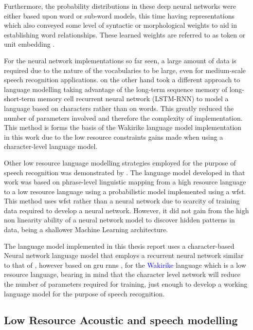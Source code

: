 Furthermore, the probability distributions in these deep neural networks were either based upon word or sub-word models, this time having representations which also conveyed some level of syntactic or morphological weights to aid in establishing word relationships.  These learned weights are referred to as token or unit embedding \citep{pennington-etal-2014-glove}.

For the neural network implementations so far seen, a large amount of data is required due to the nature of the vocabularies to be large, even for medium-scale speech recognition applications.   \cite{kim2016character} on the other hand took a different approach to language modelling taking advantage of the long-term sequence memory of long-short-term memory cell recurrent neural network (LSTM-RNN) to model a language based on characters rather than on words.  This greatly reduced the number of parameters involved and therefore the complexity of implementation.  This method is forms the basis of the Wakirike language model implementation in this work due to the low resource constraints gains made when using a character-level language model.

Other low resource language modelling strategies employed for the purpose of speech recognition was demonstrated by \cite{xu2013cross}.  The language model developed in that work was based on phrase-level linguistic mapping from a high resource language to a low resource language using a probabilistic model implemented using a \acrfull{wfst}.  This method uses \acrshort{wfst} rather than a neural network due to scarcity of training data required to develop a neural network. However, it did not gain from the high non linearity ability of a neural network model to discover hidden patterns in data, being a shallower Machine Learning architecture.

The language model implemented in this thesis report uses a character-based Neural network language model that employs a recurrent neural network similar to that of \cite{kim2016character}, however based on \acrfull{gru} \acrshort{rnns} \citep{cho2014learning}, for the \textcolor{blue}{Wakirike} language which is a low resource language, bearing in mind that the character level network will reduce the number of parameters required for training, just enough to develop a working language model for the purpose of speech recognition. 

\subsection{Low Resource Acoustic and speech modelling}

